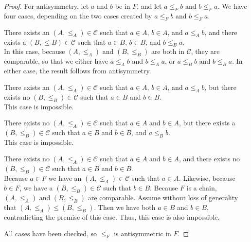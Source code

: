 \documentclass[../../math.tex]{subfiles}
\begin{document}
\begin{proof}
    For antisymmetry, let $a$ and $b$ be in $F$, and let $a \leq_F b$ and $b
    \leq_F a$.  We have four cases, depending on the two cases created by
    $a \leq_F b$ and $b \leq_F a$.
    \begin{case} There exists an $(A, \leq_A) \in \mathcal C$ such that $a \in
    A$, $b \in A$, and $a \leq_A b$, and there exists a $(B, \leq B) \in
    \mathcal C$ such that $a \in B$, $b \in B$, and $b \leq_B a$. \\
        \indent In this case, because $(A, \leq_A)$ and $(B, \leq_B)$ are both
        in $\mathcal C$, they are comparable, so that we either have $a \leq_A
        b$ and $b \leq_A a$, or $a \leq_B b$ and $b \leq_B a$.  In either case,
        the result follows from antisymmetry.
    \end{case}
    \begin{case} There exists an $(A, \leq_A) \in \mathcal C$ such that $a \in
    A$, $b \in A$, and $a \leq_A b$, but there exists no $(B, \leq_B) \in
    \mathcal C$ such that $a \in B$ and $b \in B$. \\
        \indent This case is impossible.
    \end{case}
    \begin{case} There exists no $(A, \leq_A) \in \mathcal C$ such that $a \in
    A$ and $b \in A$, but there exists a $(B, \leq_B) \in \mathcal C$ such that
    $a \in B$ and $b \in B$, and $a \leq_B b$. \\
        \indent This case is impossible.
    \end{case}
    \begin{case} There exists no $(A, \leq_A) \in \mathcal C$ such that $a \in
    A$ and $b \in A$, and there exists no $(B, \leq_B) \in \mathcal C$ such that
    $a \in B$ and $b \in B$. \\
        \indent Because $a \in F$ we have an $(A, \leq_A) \in \mathcal C$ such
        that $a \in A$.  Likewise, because $b \in F$, we have a $(B, \leq_B) \in
        \mathcal C$ such that $b \in B$.  Because $F$ is a chain, $(A, \leq_A)$
        and $(B, \leq_B)$ are comparable.  Assume without loss of generality
        that $(A, \leq_A) \leq (B, \leq_B)$.  Then we have both $a \in B$ and $b
        \in B$, contradicting the premise of this case.  Thus, this case is also
        impossible.
    \end{case}
    \noindent All cases have been checked, so $\leq_F$ is antisymmetric in $F$.


\end{proof}
\end{document}

